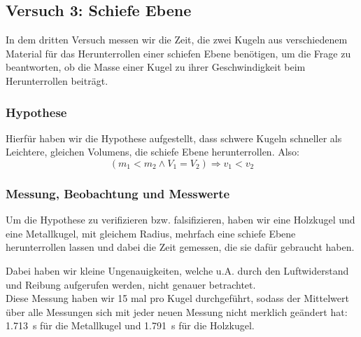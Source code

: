 \documentclass[11pt,a4paper,titlepage, ngerman]{article}
\begin{document}
		\newpage
		\subsection{Versuch 3: Schiefe Ebene}
			\label{2.3}
			
			In dem dritten Versuch messen wir die Zeit, die zwei Kugeln aus verschiedenem Material für das Herunterrollen einer schiefen Ebene benötigen, um die Frage zu beantworten, ob die Masse einer Kugel zu ihrer Geschwindigkeit beim Herunterrollen beiträgt.	
					
			\subsubsection{Hypothese}
				\label{2.3.1}
				
				Hierfür haben wir die Hypothese aufgestellt, dass schwere Kugeln schneller als Leichtere, gleichen Volumens, die schiefe Ebene herunterrollen. Also: 
				\begin{equation*}
					(m_1 < m_2 \wedge V_1 = V_2) \Rightarrow v_1 < v_2
				\end{equation*}
					
			\subsubsection{Messung, Beobachtung und Messwerte}
				\label{2.3.2}
				
				Um die Hypothese zu verifizieren bzw. falsifizieren, haben wir eine Holzkugel und eine Metallkugel, mit gleichem Radius, mehrfach eine schiefe Ebene herunterrollen lassen und dabei die Zeit gemessen, die sie dafür gebraucht haben.
				
				Dabei haben wir kleine Ungenauigkeiten, welche u.A. durch den Luftwiderstand und Reibung aufgerufen werden, nicht genauer betrachtet. \\
				
				Diese Messung haben wir 15 mal pro Kugel durchgeführt, sodass der Mittelwert über alle Messungen sich mit jeder neuen Messung nicht merklich geändert hat: \SI{1.713}{\s} für die Metallkugel und \SI{1.791}{\s} für die Holzkugel.
				
\end{document}
